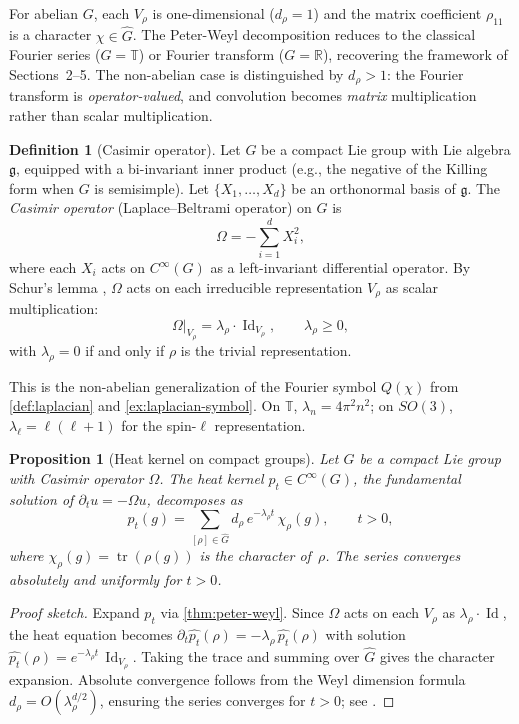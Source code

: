 \documentclass[12pt]{amsart}
\newtheorem{proposition}[theorem]{Proposition}
\theoremstyle{definition}
\newtheorem{definition}[theorem]{Definition}
\theoremstyle{remark}
\newcommand{\R}{\mathbb{R}}
\newcommand{\bT}{\mathbb{T}}
\begin{document}
For abelian $G$, each $V_\rho$ is one-dimensional ($d_\rho = 1$) and the matrix coefficient $\rho_{11}$ is a character $\chi \in \widehat{G}$. The Peter-Weyl decomposition reduces to the classical Fourier series ($G = \bT$) or Fourier transform ($G = \R$), recovering the framework of Sections~2--5. The non-abelian case is distinguished by $d_\rho > 1$: the Fourier transform is \emph{operator-valued}, and convolution becomes \emph{matrix} multiplication rather than scalar multiplication.

\begin{definition}[Casimir operator]\label{def:casimir}
Let $G$ be a compact Lie group with Lie algebra $\mathfrak{g}$, equipped with a bi-invariant inner product (e.g., the negative of the Killing form when $G$ is semisimple). Let $\{X_1, \ldots, X_d\}$ be an orthonormal basis of $\mathfrak{g}$. The \emph{Casimir operator} (Laplace--Beltrami operator) on $G$ is
\[
\Omega = -\sum_{i=1}^d X_i^2,
\]
where each $X_i$ acts on $C^\infty(G)$ as a left-invariant differential operator. By Schur's lemma \cite[Proposition~10.7]{Hall}, $\Omega$ acts on each irreducible representation $V_\rho$ as scalar multiplication:
\[
\Omega\big|_{V_\rho} = \lambda_\rho \cdot \operatorname{Id}_{V_\rho}, \qquad \lambda_\rho \geq 0,
\]
with $\lambda_\rho = 0$ if and only if $\rho$ is the trivial representation.
\end{definition}

This is the non-abelian generalization of the Fourier symbol $Q(\chi)$ from \cref{def:laplacian} and \cref{ex:laplacian-symbol}. On $\bT$, $\lambda_n = 4\pi^2 n^2$; on $SO(3)$, $\lambda_\ell = \ell(\ell+1)$ for the spin-$\ell$ representation.

\begin{proposition}[Heat kernel on compact groups]\label{prop:heat-compact}
Let $G$ be a compact Lie group with Casimir operator $\Omega$. The heat kernel $p_t \in C^\infty(G)$, the fundamental solution of $\partial_t u = -\Omega u$, decomposes as
\[
p_t(g) = \sum_{[\rho] \in \widehat{G}} d_\rho\, e^{-\lambda_\rho t}\, \chi_\rho(g), \qquad t > 0,
\]
where $\chi_\rho(g) = \operatorname{tr}(\rho(g))$ is the character of~$\rho$. The series converges absolutely and uniformly for $t > 0$.
\end{proposition}

\begin{proof}[Proof sketch]
Expand $p_t$ via \cref{thm:peter-weyl}. Since $\Omega$ acts on each $V_\rho$ as $\lambda_\rho \cdot \operatorname{Id}$, the heat equation becomes $\partial_t \widehat{p_t}(\rho) = -\lambda_\rho\, \widehat{p_t}(\rho)$ with solution $\widehat{p_t}(\rho) = e^{-\lambda_\rho t}\, \operatorname{Id}_{V_\rho}$. Taking the trace and summing over $\widehat{G}$ gives the character expansion. Absolute convergence follows from the Weyl dimension formula $d_\rho = O(\lambda_\rho^{d/2})$, ensuring the series converges for $t > 0$; see \cite[\S 3]{Diaconis}.
\end{proof}
\end{document}
